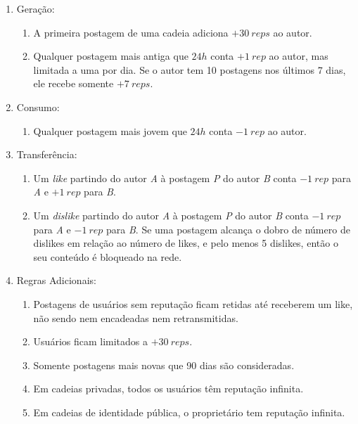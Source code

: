 \documentclass[12pt]{article}
\begin{document}
\begin{enumerate}
\item Geração:
    \begin{enumerate}
    \item A primeira postagem de uma cadeia adiciona $+30~reps$ ao autor.
    \item Qualquer postagem mais antiga que $24h$ conta $+1~rep$ ao autor, mas
          limitada a uma por dia. Se o autor tem 10 postagens nos últimos 7
          dias, ele recebe somente $+7~reps$.
    \end{enumerate}
\item Consumo:
    \begin{enumerate}
    \item Qualquer postagem mais jovem que $24h$ conta $-1~rep$ ao autor.
    \end{enumerate}
\item Transferência:
    \begin{enumerate}
    \item Um \emph{like}    partindo do autor \emph{A} à postagem \emph{P} do
          autor \emph{B} conta $-1~rep$ para \emph{A} e $+1~rep$ para \emph{B}.
    \item Um \emph{dislike} partindo do autor \emph{A} à postagem \emph{P} do
          autor \emph{B} conta $-1~rep$ para \emph{A} e $-1~rep$ para \emph{B}.
          Se uma postagem alcança o dobro de número de dislikes em relação ao
          número de likes, e pelo menos 5 dislikes, então o seu conteúdo é
          bloqueado na rede.
    \end{enumerate}
\item Regras Adicionais:
    \begin{enumerate}
    \item Postagens de usuários sem reputação ficam retidas até receberem um
          like, não sendo nem encadeadas nem retransmitidas.
    \item Usuários ficam limitados a $+30~reps$.
    \item Somente postagens mais novas que 90 dias são consideradas.
    \item Em cadeias privadas, todos os usuários têm reputação infinita.
    \item Em cadeias de identidade pública, o proprietário tem reputação
          infinita.
    \end{enumerate}
\end{enumerate}
\end{document}
